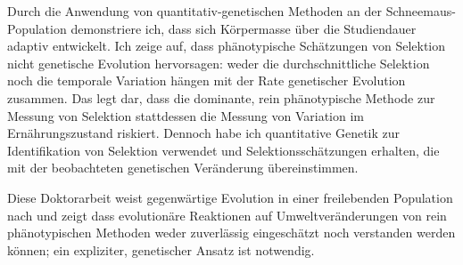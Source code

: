 \begin{zusammenfassung}
Durch die Anwendung von quantitativ-genetischen Methoden an der Schneemaus-Population demonstriere ich, dass sich K{\"o}rpermasse {\"u}ber die Studiendauer adaptiv entwickelt. Ich zeige auf, dass ph{\"a}notypische Sch{\"a}tzungen von Selektion nicht genetische Evolution hervorsagen: weder die durchschnittliche Selektion noch die temporale Variation h{\"a}ngen mit der Rate genetischer Evolution zusammen. Das legt dar, dass die dominante, rein ph{\"a}notypische Methode zur Messung von Selektion stattdessen die Messung von Variation im Ern{\"a}hrungszustand riskiert. Dennoch habe ich quantitative Genetik zur Identifikation von Selektion verwendet und Selektionssch{\"a}tzungen erhalten, die  mit der beobachteten genetischen Ver{\"a}nderung {\"u}bereinstimmen. 

Diese Doktorarbeit weist gegenw{\"a}rtige Evolution in einer freilebenden Population nach und zeigt dass evolution{\"a}re Reaktionen auf Umweltver{\"a}nderungen  von rein ph{\"a}notypischen Methoden weder zuverl{\"a}ssig eingesch{\"a}tzt noch verstanden werden k{\"o}nnen; ein expliziter, genetischer Ansatz ist notwendig. 
\end{zusammenfassung}
